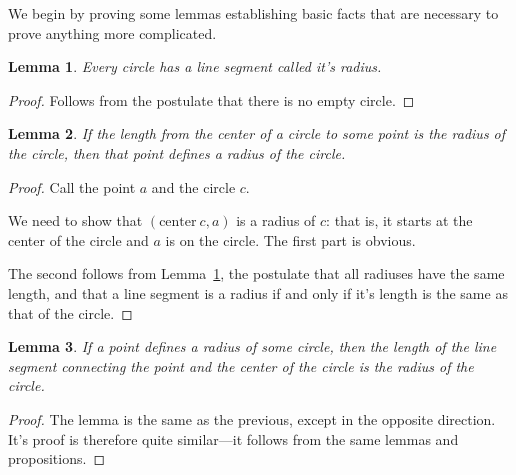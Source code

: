 \documentclass[10pt]{article}
\newtheorem{lemma}{Lemma}
\begin{document}
We begin by proving some lemmas establishing basic facts that are necessary to prove anything more complicated.

\begin{lemma}\label{lemma:has-radius}
    Every circle has a line segment called it's radius.
\end{lemma}
\begin{proof}
    Follows from the postulate that there is no empty circle.
\end{proof}

\begin{lemma}
    If the length from the center of a circle to some point is the radius of the circle, then that point defines a radius of the circle.
\end{lemma}
\begin{proof}
    Call the point $a$ and the circle $c$.

    We need to show that $(\text{center}~c, a)$ is a radius of $c$: that is, it starts at the center of the circle and $a$ is on the circle.
    The first part is obvious.

    The second follows from Lemma~\ref{lemma:has-radius}, the postulate that all radiuses have the same length, and that a line segment is a radius if and only if it's length is the same as that of the circle.
\end{proof}

\begin{lemma}
    If a point defines a radius of some circle, then the length of the line segment connecting the point and the center of the circle is the radius of the circle.
\end{lemma}
\begin{proof}
    The lemma is the same as the previous, except in the opposite direction.
    It's proof is therefore quite similar---it follows from the same lemmas and propositions.
\end{proof}
\end{document}
